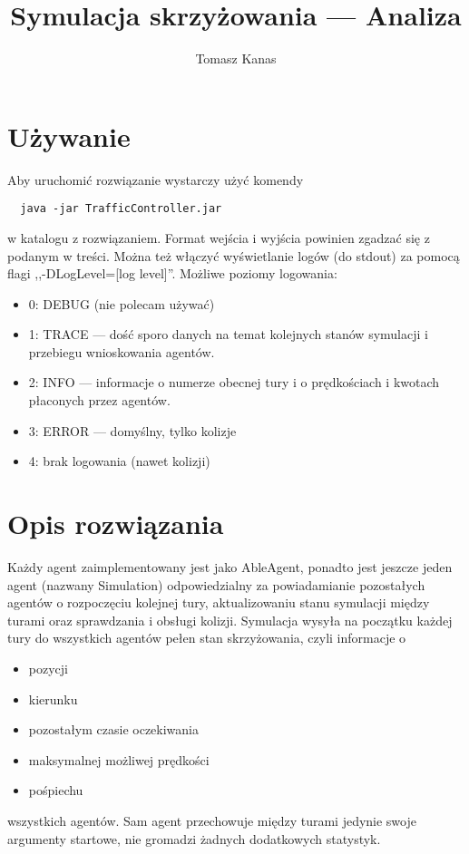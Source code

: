 \documentclass[11pt]{article}
\title{Symulacja skrzyżowania --- Analiza}
\author{Tomasz Kanas}
\begin{document}
\maketitle

\section{Używanie}
Aby uruchomić rozwiązanie wystarczy użyć komendy
\begin{lstlisting}
  java -jar TrafficController.jar
\end{lstlisting}
w katalogu z rozwiązaniem. Format wejścia i wyjścia powinien zgadzać się z podanym w treści. Można też włączyć wyświetlanie logów (do stdout) za pomocą flagi ,,-DLogLevel=[log level]''. Możliwe poziomy logowania:
\begin{itemize}
\item 0: DEBUG (nie polecam używać)
\item 1: TRACE --- dość sporo danych na temat kolejnych stanów symulacji i przebiegu wnioskowania agentów.
\item 2: INFO --- informacje o numerze obecnej tury i o prędkościach i kwotach płaconych przez agentów.
\item 3: ERROR --- domyślny, tylko kolizje
\item 4: brak logowania (nawet kolizji)
\end{itemize}

\section{Opis rozwiązania}
Każdy agent zaimplementowany jest jako AbleAgent, ponadto jest jeszcze jeden agent (nazwany Simulation) odpowiedzialny za powiadamianie pozostałych agentów o rozpoczęciu kolejnej tury, aktualizowaniu stanu symulacji między turami oraz sprawdzania i obsługi kolizji. Symulacja wysyła na początku każdej tury do wszystkich agentów pełen stan skrzyżowania, czyli informacje o
\begin{itemize}
\item pozycji
\item kierunku
\item pozostałym czasie oczekiwania
\item maksymalnej możliwej prędkości
\item pośpiechu
\end{itemize}
wszystkich agentów. Sam agent przechowuje między turami jedynie swoje argumenty startowe, nie gromadzi żadnych dodatkowych statystyk.
\end{document}
